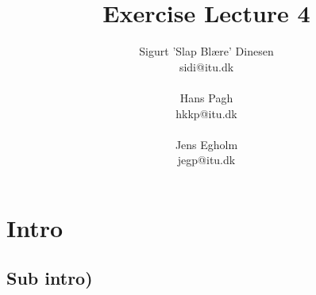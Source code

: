 \documentclass[a4paper, titlepage]{article}
\begin{document}
\title{Exercise Lecture 4}
\author{Sigurt 'Slap Blære' Dinesen \\sidi{@}itu.dk \\\\ Hans Pagh \\hkkp@itu.dk \\\\Jens
Egholm \\jegp@itu.dk}
\maketitle
\tableofcontents
\pagebreak

\section*{Intro}
\subsection*{Sub intro)}
\end{document}
